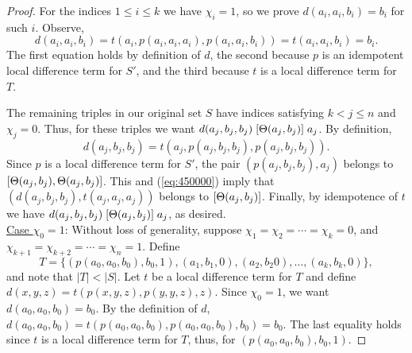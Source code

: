 \begin{proof}
For the indices $1\leq i \leq k$ we have $\chi_i =1$, so we prove
$d(a_i,a_i,b_i) = b_i$ for such $i$. Observe,
\[
  d(a_i,a_i,b_i) =
  t(a_i, p(a_i,a_i,a_i), p(a_i,a_i,b_i)) %
  =t(a_i, a_i, b_i) %
  =b_i. %
\]
The first equation holds by definition of $d$, the second
because $p$ is an idempotent local difference term for
$S'$, and the third because $t$ is a local difference term for $T$.

The remaining triples in our original set $S$
have indices satisfying $k<j\leq n$ and $\chi_j = 0$.
Thus, for these triples we want
$d(a_j,b_j,b_j)\mathrel{[\Theta(a_j,b_j)]} a_j$.
By definition,
\begin{equation}
  \label{eq:450000}
d(a_j,b_j,b_j) =t(a_j, p(a_j,b_j,b_j), p(a_j,b_j,b_j)).  
\end{equation}
Since $p$ is a local difference term for $S'$, %
the pair $(p(a_j,b_j,b_j), a_j)$ belongs to $[\Theta(a_j,b_j), \Theta(a_j,b_j)]$.
This and 
(\ref{eq:450000}) imply
that 
$(d(a_j, b_j,b_j), t(a_j,a_j,a_j))$
belongs to
$[\Theta(a_j,b_j)]$.
Finally, by idempotence of $t$ we have
$d(a_j,b_j,b_j)\mathrel{[\Theta(a_j,b_j)]} a_j$,
as desired.
\\[4pt]
\underline{Case $\chi_0 = 1$}:
Without loss of generality, suppose $\chi_1 = \chi_2 =\cdots =\chi_k = 0$,
and $\chi_{k+1} = \chi_{k+2} = \cdots = \chi_{n} = 1$. Define 
\[
T = \{(p(a_0, a_0, b_0), b_0, 1),
(a_1, b_1, 0), (a_2, b_2 0), \dots, (a_k, b_k, 0)\},
\]
and note that $|T| < |S|$.
Let $t$ be a local difference term for $T$ and
define
$d(x,y,z) = t(p(x,y,z), p(y,y,z), z)$. 
Since $\chi_0 =1$, we want $d(a_0,a_0,b_0) = b_0$. By the definition of
$d$,
$d(a_0,a_0,b_0) =
t(p(a_0,a_0,b_0), p(a_0,a_0,b_0), b_0) =b_0$.
The last equality holds since $t$ is a local difference term for $T$, thus,
for $(p(a_0, a_0, b_0), b_0, 1)$.


\end{proof}
